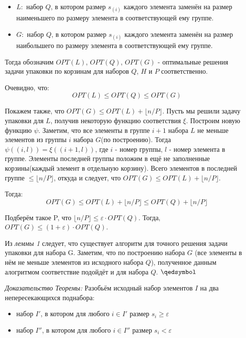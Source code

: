 \documentclass[a4paper,14pt,russian]{article}
\begin{document}
\begin{itemize}
  \item $L:$ набор $Q$, в котором размер $s_{(i)}$ каждого элемента заменён на размер наименьшего по размеру элемента в соответствующей ему группе.
  \item $G:$ набор $Q$, в котором размер $s_{(i)}$ каждого элемента заменён на размер наибольшего по размеру элемента в соответствующей ему группе.
\end{itemize}

Тогда обозначим $OPT(L)$, $OPT(Q)$, $OPT(G)$ - оптимальные решения задачи упаковки по корзинам для наборов $Q$, $H$ и $P$ соответственно.

Очевидно, что:
$$OPT(L) \leq OPT(Q) \leq OPT(G)$$

Покажем также, что $OPT(G) \leq OPT(L) + \lfloor{n/P\rfloor}$. Пусть мы решили задачу упаковки для $L$, получив некоторую функцию соответствия $\xi$. Построим новую функцию $\psi$. Заметим, что все элементы в группе $i+1$ набора $L$ не меньше элементов из группы $i$ набора $G$(по построению). Тогда $\psi((i, l)) = \xi((i+1, l))$, где $i$ - номер группы, $l$ - номер элемента в группе. Элементы последней группы положим в ещё не заполненные корзины(каждый элемент в отдельную корзину). Всего элементов в последней группе $\leq \lfloor{n/P\rfloor}$, откуда и следует, что $OPT(G) \leq OPT(L) + \lfloor{n/P\rfloor}$.

Тогда:
$$ OPT(G) \leq OPT(L) + \lfloor{n/P\rfloor} \leq OPT(Q) + \lfloor{n/P\rfloor}$$

Подберём такое P, что $\lfloor{n/P\rfloor} \leq \varepsilon \cdot OPT(Q)$.
Тогда, $OPT(G) \leq (1 + \varepsilon) \cdot OPT(Q)$. 

Из \textit{леммы 1} следует, что существует алгоритм для точного решения задачи упаковки для набора G. Заметим, что по построению набора $G$ (все элементы в нём не меньше элементов из исходного набора $Q$), полученное данным алогритмом соответствие подойдёт и для набора $Q$.
$\qedsymbol$

\textit{Доказательство Теоремы:} Разобьём исходный набор элементов $I$ на два непересекающихся поднабора:

\begin{itemize}
  \item набор $I'$, в котором для любого $i \in I'$ размер $s_{i} \geq \varepsilon$ 
  \item набор $I''$, в котором для любого $i \in I''$ размер $s_{i} < \varepsilon$ 
\end{itemize}
\end{document}
